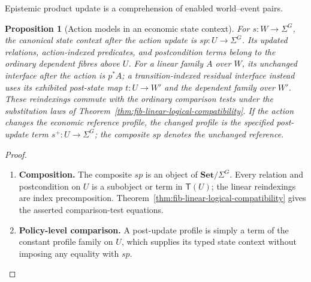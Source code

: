 \documentclass[11pt,a4paper]{article}
\numberwithin{equation}{section}
\newtheorem{proposition}[theorem]{Proposition}
\theoremstyle{definition}
\theoremstyle{remark}
\theoremstyle{plain}
\begin{document}
\noindent Epistemic product update is a comprehension of enabled world--event pairs.
\begin{center}
\end{center}

\begin{proposition}[Action models in an economic state context]
\label{prop:egt-action-state-tower}
For $s:W\to\Sigma^G$, the canonical state context after the action
update is $sp:U\to\Sigma^G$. Its updated relations, action-indexed
predicates, and postcondition terms belong to the ordinary dependent
fibres above $U$. For a linear family $A$ over $W$, its unchanged
interface after the action is $p^*A$; a transition-indexed residual
interface instead uses its exhibited post-state map $t:U\to W'$ and
the dependent family over $W'$. These reindexings commute with the
ordinary comparison tests under the substitution laws of
Theorem~\ref{thm:fib-linear-logical-compatibility}. If the action changes the economic reference profile, the changed profile is the specified post-update term $s^+:U\to\Sigma^G$; the composite $sp$ denotes the unchanged reference.
\end{proposition}
\begin{proof}
\leavevmode
\begin{enumerate}[label=\textup{(\arabic*)},leftmargin=*,itemsep=4pt,topsep=3pt]
  \item \textbf{Composition.} The composite $sp$ is an object of $\mathbf{Set}/\Sigma^G$. Every relation and postcondition on $U$ is a subobject or term in
$\mathsf T(U)$; the linear reindexings are index precomposition. Theorem~\ref{thm:fib-linear-logical-compatibility} gives the asserted
comparison-test equations.
  \item \textbf{Policy-level comparison.} A post-update profile is simply a term of
the constant profile family on $U$, which supplies its typed state
context without imposing any equality with $sp$.
\end{enumerate}
\end{proof}
\end{document}
